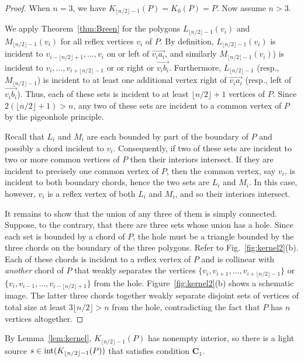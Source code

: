 \documentclass[12pt]{article}
\newcommand{\floor}[1]{{\lfloor #1 \rfloor}}
\begin{document}
\begin{proof}
When $n=3$, we have $K_{\floor{n/2}-1}(P) = K_0(P) = P$.
Now assume $n > 3$.

We apply Theorem~\ref{thm:Breen} for the polygons $L_{\floor{n/2}-1}(v_i)$ and
$M_{\floor{n/2}-1}(v_i)$ for all reflex vertices $v_i$ of $P$. By definition,
$L_{\floor{n/2}-1}(v_i)$ is incident to $v_{i-\floor{n/2}+1},\ldots, v_i$ on or left of $\overrightarrow{v_ia_i}$, and similarly $M_{\floor{n/2}-1}(v_i)$) is incident to $v_i, \ldots, v_{i+\floor{n/2}-1}$ or or right or $\overrightarrow{v_ib_i}$.
Furthermore, $L_{\floor{n/2}-1}$ (resp., $M_{\floor{n/2}-1}$)
is incident to at least one additional vertex right of $\overrightarrow{v_ia_i}$
(resp., left of $\overrightarrow{v_ib_i}$). Thus, each of these sets is incident to
at least $\floor{n/2}+1$ vertices of $P$. Since $2(\floor{n/2}+1) > n$,
any two of these sets are incident to a common vertex of $P$ by the pigeonhole principle.

Recall that $L_i$ and $M_i$ are each bounded by part of the boundary of $P$
and possibly a chord incident to $v_i$. Consequently, if two of these sets are incident
to two or more common vertices of $P$ then their interiors intersect. If they are incident
to precisely one common vertex of $P$, then the common vertex, say $v_i$, is incident to
both boundary chords, hence the two sets are $L_i$ and $M_i$. In this case, however,
$v_i$ is a reflex vertex of both $L_i$ and $M_i$, and so their interiors intersect.

It remains to show that the union of any three of them is simply connected.
Suppose, to the contrary, that there are three sets whose union has a hole. Since each set is bounded by a chord of $P$, the hole must be a triangle bounded by the three chords on the boundary of the three polygons. Refer to Fig.~\ref{fig:kernel2}(b).
Each of these chords is incident to a reflex vertex of $P$ and is collinear with \emph{another} chord of $P$ that weakly separates the vertices
$\{v_i,v_{i+1}, \ldots, v_{i+\floor{n/2}-1}\}$ or
$\{v_i,v_{i-1}, \ldots, v_{i-\floor{n/2}+1}\}$ from the hole.
Figure~\ref{fig:kernel2}(b) shows a schematic image.
The latter three chords together weakly separate disjoint sets of vertices
  of total size at least $3\floor{n/2}>n$ from the hole,
contradicting the fact that $P$ has $n$ vertices altogether.
\end{proof}

By Lemma~\ref{lem:kernel}, $K_{\floor{n/2}-1}(P)$ has nonempty interior,
so there is a light source $s\in {\rm int}(K_{\floor{n/2}-1}(P))$ 
that satisfies condition $\mathbf{C}_1$.
\end{document}

